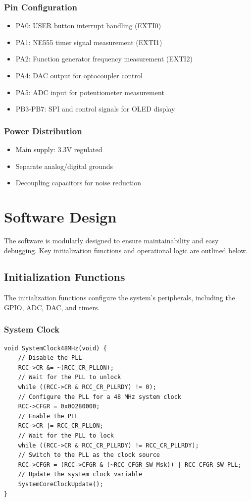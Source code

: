 \subsubsection{Pin Configuration}
\begin{itemize}
     \item PA0: USER button interrupt handling (EXTI0)
     \item PA1: NE555 timer signal measurement (EXTI1)
     \item PA2: Function generator frequency measurement (EXTI2)
    \item PA4: DAC output for optocoupler control
    \item PA5: ADC input for potentiometer measurement
    \item PB3-PB7: SPI and control signals for OLED display
\end{itemize}



\subsubsection{Power Distribution}
\begin{itemize}
    \item Main supply: 3.3V regulated
    \item Separate analog/digital grounds
    \item Decoupling capacitors for noise reduction
\end{itemize}

\newpage

\section{Software Design}
The software is modularly designed to ensure maintainability and easy debugging. Key initialization functions and operational logic are outlined below.

\subsection{Initialization Functions}
The initialization functions configure the system's peripherals, including the GPIO, ADC, DAC, and timers.

\subsubsection{System Clock}
\begin{lstlisting}[caption=System Clock Initialization Function]
void SystemClock48MHz(void) {
    // Disable the PLL
    RCC->CR &= ~(RCC_CR_PLLON);
    // Wait for the PLL to unlock
    while ((RCC->CR & RCC_CR_PLLRDY) != 0);
    // Configure the PLL for a 48 MHz system clock
    RCC->CFGR = 0x00280000;
    // Enable the PLL
    RCC->CR |= RCC_CR_PLLON;
    // Wait for the PLL to lock
    while ((RCC->CR & RCC_CR_PLLRDY) != RCC_CR_PLLRDY);
    // Switch to the PLL as the clock source
    RCC->CFGR = (RCC->CFGR & (~RCC_CFGR_SW_Msk)) | RCC_CFGR_SW_PLL;
    // Update the system clock variable
    SystemCoreClockUpdate();
}
\end{lstlisting}

